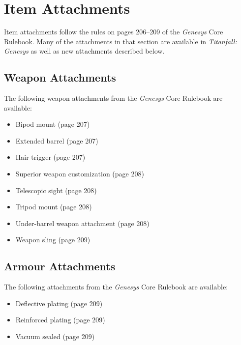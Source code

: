 \documentclass[9pt, openany]{extbook}
\begin{document}
\chapter{Item Attachments}
Item attachments follow the rules on pages 206--209 of the \emph{Genesys} Core Rulebook. Many of the attachments in that section are available in \emph{Titanfall: Genesys} as well as new attachments described below.

\section{Weapon Attachments}

The following weapon attachments from the \emph{Genesys} Core Rulebook are available:

\begin{itemize}[noitemsep]
\item Bipod mount (page 207)
\item Extended barrel (page 207)
\item Hair trigger (page 207)
\item Superior weapon customization (page 208)
\item Telescopic sight (page 208)
\item Tripod mount (page 208)
\item Under-barrel weapon attachment (page 208)
\item Weapon sling (page 209)
\end{itemize}



\section{Armour Attachments}
The following attachments from the \emph{Genesys} Core Rulebook are available:

\begin{itemize}[noitemsep]
\item Deflective plating (page 209)
\item Reinforced plating (page 209)
\item Vacuum sealed (page 209)
\end{itemize}



\appendix
\end{document}
